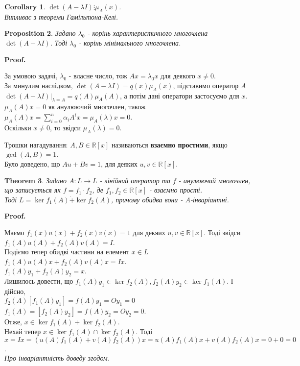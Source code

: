 \documentclass[a4paper, 10pt]{article}
\makeatletter
\theoremstyle{theoremdd}
\newtheorem{theorem}{Theorem}[subsection]
\newtheorem{proposition}[theorem]{Proposition}
\newtheorem{corollary}[theorem]{Corollary}
\renewenvironment{proof}[1][Proof.\\]{\par
\pushQED{\hfill \qed}%
\normalfont \topsep6\p@\@plus6\p@\relax
\trivlist
\item\relax
{\bfseries
#1\@addpunct{.}}\hspace\labelsep\ignorespaces
}{%
\popQED\endtrivlist\@endpefalse
}
\makeatother
\begin{document}
\begin{corollary}
$\det (A-\lambda I) \vdots \mu_A(x)$.\\
\textit{Випливає з теореми Гамільтона-Келі.}
\end{corollary}

\begin{proposition}
Задано $\lambda_0$ - корінь характеристичного многочлена $\det(A-\lambda I)$. Тоді $\lambda_0$ - корінь мінімального многочлена.
\end{proposition}

\begin{proof}
За умовою задачі, $\lambda_0$ - власне число, тож $Ax = \lambda_0 x$ для деякого $x \neq 0$.\\
За минулим наслідком, $\det(A-\lambda I) = q(x)\mu_A(x)$, підставимо оператор $A$\\
$\det(A-\lambda I)|_{\lambda = A} = q(A) \mu_A(A)$, а потім дані оператори застосуємо для $x$.\\
$\mu_A(A)x = 0$ як анулюючий многочлен, також\\
$\mu_A(A)x = \displaystyle\sum_{i=0}^n \alpha_i A^ix = \mu_A(\lambda) x = 0$.\\
Оскільки $x \neq 0$, то звідси $\mu_A(\lambda) = 0$.
\end{proof}

Трошки нагадування: $A,B \in \mathbb{R}[x]$ називаються \textbf{взаємно простими}, якщо $\gcd(A,B)=1$.\\
Було доведено, що $Au + Bv = 1$, для деяких $u,v \in \mathbb{R}[x]$.

\begin{theorem}
Задано $A: L \to L$ - лінійний оператор та $f$ - анулюючий многочлен, що записується як $f = f_1 \cdot f_2$, де $f_1,f_2 \in \mathbb{R}[x]$ - взаємно прості.\\
Тоді $L = \ker f_1(A) \dot{+} \ker f_2(A)$, причому обидва вони - $A$-інваріантні.
\end{theorem}

\begin{proof}
Маємо $f_1(x)u(x) + f_2(x)v(x) = 1$ для декяих $u,v \in \mathbb{R}[x]$. Тоді звідси\\
$f_1(A)u(A) + f_2(A)v(A) = I$.\\
Подіємо тепер обидві частини на елемент $x \in L$\\
$f_1(A)u(A)x + f_2(A)v(A)x = Ix$.\\
$f_1(A)y_1 + f_2(A)y_2 = x$. \\
Лишилось довести, що $f_1(A) y_1 \in \ker f_2(A), f_2(A) y_2 \in \ker f_1(A)$. І дійсно,\\
$f_2(A) [f_1(A)y_1] = f(A) y_1 = O y_1 = 0$\\
$f_1(A) = [f_2(A)y_2] = f(A) y_2 = O y_2 = 0$.\\
Отже, $x \in \ker f_1(A) + \ker f_2(A)$.\\
Нехай тепер $x \in \ker f_1(A) \cap \ker f_2(A)$. Тоді\\
$x = Ix = (u(A)f_1(A)+v(A)f_2(A))x = u(A)f_1(A)x + v(A)f_2(A)x = 0 + 0 = 0$.
\bigskip \\
\textit{Про інваріантність доведу згодом.}
\end{proof}
\end{document}
